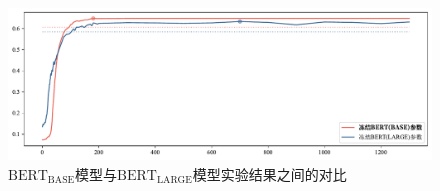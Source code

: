 \begin{figure}[htb]
	\centering
	\includegraphics[width=0.75\linewidth]{images/模型大小.pdf}
	\caption{$\text{BERT}_\text{BASE}$模型与$\text{BERT}_\text{LARGE}$模型实验结果之间的对比}
	\label{fig:LargeBert}
\end{figure}